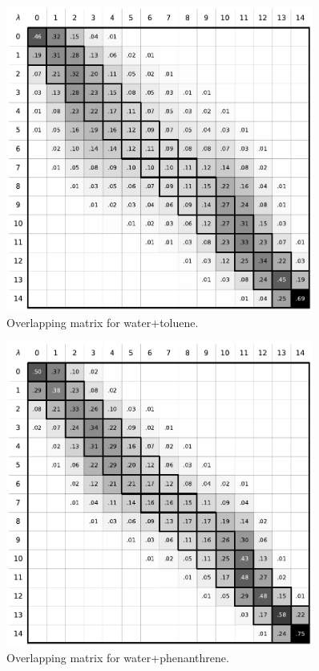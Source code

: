 \documentclass[
	12pt,				%
	openany,			%
	oneside,			%
	a4paper,			%
	english,			%
	brazil				%
	]{abntex2}
\begin{document}
\begin{apendicesenv}
\begin{figure}[H]
	\centering
	\includegraphics[width=0.9\textwidth]{Figures/owat_tol}
	\caption{Overlapping matrix for water+toluene.}
\end{figure}

\begin{figure}[H]
	\centering
	\includegraphics[width=0.9\textwidth]{Figures/owat_phen}
	\caption{Overlapping matrix for water+phenanthrene.}
\end{figure}


\end{apendicesenv}
\end{document}
